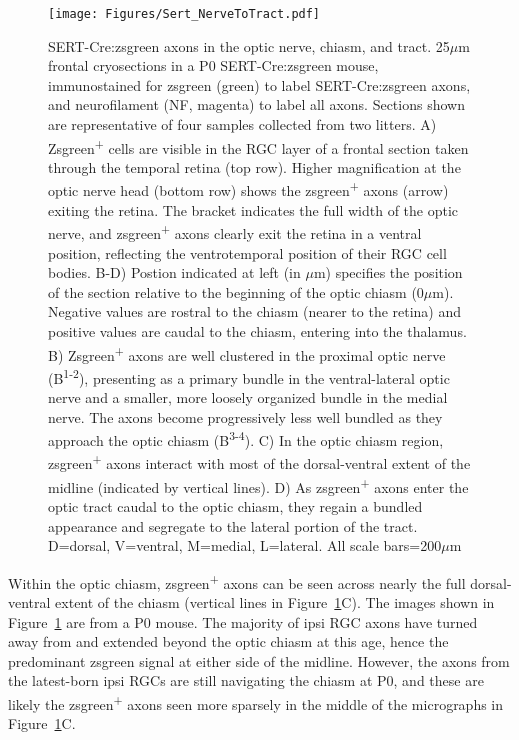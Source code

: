 \begin{figure}[hbtp]
	\begin{center}
		\texttt{[image: Figures/Sert\_NerveToTract.pdf]}
		\caption[SERT-Cre:zsgreen axons in the optic nerve, chiasm, and tract.]
		{SERT-Cre:zsgreen axons in the optic nerve, chiasm, and tract. 
		25$\mu$m frontal cryosections in a P0 SERT-Cre:zsgreen mouse, immunostained for zsgreen (green) to label SERT-Cre:zsgreen axons, and neurofilament (NF, magenta) to label all axons.
		Sections shown are representative of four samples collected from two litters. %
		A) Zsgreen\textsuperscript{+} cells are visible in the RGC layer of a frontal section taken through the temporal retina (top row).
		Higher magnification at the optic nerve head (bottom row) shows the zsgreen\textsuperscript{+} axons (arrow) exiting the retina.
		The bracket indicates the full width of the optic nerve, and zsgreen\textsuperscript{+} axons clearly exit the retina in a ventral position, reflecting the ventrotemporal position of their RGC cell bodies.
		B-D) Postion indicated at left (in $\mu$m) specifies the position of the section relative to the beginning of the optic chiasm (0$\mu$m).
		Negative values are rostral to the chiasm (nearer to the retina) and positive values are caudal to the chiasm, entering into the thalamus.
		B) Zsgreen\textsuperscript{+} axons are well clustered in the proximal optic nerve (B\textsuperscript{1-2}), presenting as a primary bundle in the ventral-lateral optic nerve and a smaller, more loosely organized bundle in the medial nerve. 
		The axons become progressively less well bundled as they approach the optic chiasm (B\textsuperscript{3-4}). 
		C) In the optic chiasm region, zsgreen\textsuperscript{+} axons interact with most of the dorsal-ventral extent of the midline (indicated by vertical lines).
		D) As zsgreen\textsuperscript{+} axons enter the optic tract caudal to the optic chiasm, they regain a bundled appearance and segregate to the lateral portion of the tract.
		D=dorsal, V=ventral, M=medial, L=lateral. 
		All scale bars=200$\mu$m}
		\label{Figures/Sert_NerveToTract}
	\end{center}
\end{figure}

Within the optic chiasm, zsgreen\textsuperscript{+} axons can be seen across nearly the full dorsal-ventral extent of the chiasm (vertical lines in Figure~\ref{Figures/Sert_NerveToTract}C).
The images shown in Figure~\ref{Figures/Sert_NerveToTract} are from a P0 mouse.
The majority of ipsi RGC axons have turned away from and extended beyond the optic chiasm at this age, hence the predominant zsgreen signal at either side of the midline.
However, the axons from the latest-born ipsi RGCs are still navigating the chiasm at P0, and these are likely the zsgreen\textsuperscript{+} axons seen more sparsely in the middle of the micrographs in Figure~\ref{Figures/Sert_NerveToTract}C.

